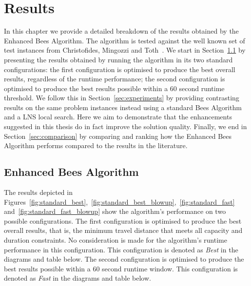 
\chapter{Results}
\label{chap:results}

In this chapter we provide a detailed breakdown of the results obtained by the Enhanced Bees Algorithm. The algorithm is tested against the well known set of test instances from Christofides, Mingozzi and Toth~\cite{CMT:1981}. We start in Section~\ref{sec:standardresults} by presenting the results obtained by running the algorithm in its two standard configurations: the first configuration is optimised to produce the best overall results, regardless of the runtime performance; the second configuration is optimised to produce the best results possible within a 60 second runtime threshold. We follow this in Section~\ref{sec:experiments} by providing contrasting results on the same problem instances instead using a standard Bees Algorithm and a LNS local search. Here we aim to demonstrate that the enhancements suggested in this thesis do in fact improve the solution quality. Finally, we end in Section~\ref{sec:comparison} by comparing and ranking how the Enhanced Bees Algorithm performs compared to the results in the literature. 

\section{Enhanced Bees Algorithm}
\label{sec:standardresults}

The results depicted in Figures~\ref{fig:standard_best},~\ref{fig:standard_best_blowup},~\ref{fig:standard_fast} and~\ref{fig:standard_fast_blowup} show the algorithm's performance on two possible configurations. The first configuration is optimised to produce the best overall results, that is, the minimum travel distance that meets all capacity and duration constraints. No consideration is made for the algorithm's runtime performance in this configuration. This configuration is denoted as \emph{Best} in the diagrams and table below. The second configuration is optimised to produce the best results possible within a 60 second runtime window. This configuration is denoted as \emph{Fast} in the diagrams and table below.



